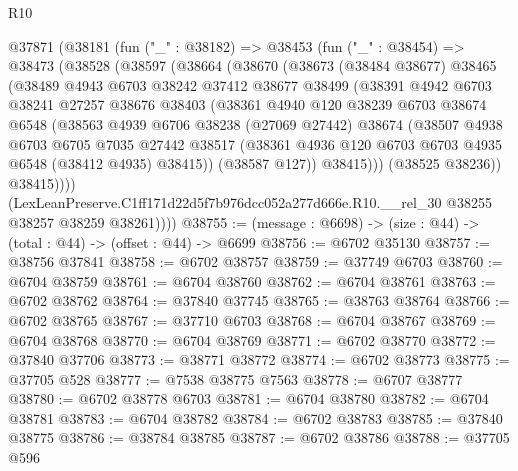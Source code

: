 \begin{lexlean}{R10}
\begin{coremodule}
  @37871
    (@38181
      (fun ("_" : @38182) =>
      @38453
        (fun ("_" : @38454) =>
        @38473
          (@38528
            (@38597
              (@38664
                (@38670
                  (@38673
                    (@38484 @38677)
                    @38465
                    (@38489
                      @4943
                      @6703
                      @38242
                      @37412
                      @38677
                      @38499
                      (@38391
                        @4942
                        @6703
                        @38241
                        @27257
                        @38676
                        @38403
                        (@38361
                          @4940
                          @120
                          @38239
                          @6703
                          @38674
                          @6548
                          (@38563
                            @4939
                            @6706
                            @38238
                            (@27069 @27442)
                            @38674
                            (@38507
                              @4938
                              @6703
                              @6705
                              @7035
                              @27442
                              @38517
                              (@38361 @4936 @120 @6703 @6703 @4935 @6548 (@38412 @4935) @38415))
                            (@38587 @127))
                          @38415)))
                    (@38525 @38236))
                  @38415))))
          (LexLeanPreserve.C1ff171d22d5f7b976dcc052a277d666e.R10.__rel_30
            @38255
            @38257
            @38259
            @38261))))
@38755 := (message : @6698) -> (size : @44) -> (total : @44) -> (offset : @44) -> @6699
@38756 := @6702 @35130
@38757 := @38756 @37841
@38758 := @6702 @38757
@38759 := @37749 @6703
@38760 := @6704 @38759
@38761 := @6704 @38760
@38762 := @6704 @38761
@38763 := @6702 @38762
@38764 := @37840 @37745
@38765 := @38763 @38764
@38766 := @6702 @38765
@38767 := @37710 @6703
@38768 := @6704 @38767
@38769 := @6704 @38768
@38770 := @6704 @38769
@38771 := @6702 @38770
@38772 := @37840 @37706
@38773 := @38771 @38772
@38774 := @6702 @38773
@38775 := @37705 @528
@38777 := @7538 @38775 @7563
@38778 := @6707 @38777
@38780 := @6702 @38778 @6703
@38781 := @6704 @38780
@38782 := @6704 @38781
@38783 := @6704 @38782
@38784 := @6702 @38783
@38785 := @37840 @38775
@38786 := @38784 @38785
@38787 := @6702 @38786
@38788 := @37705 @596

\end{coremodule}
\end{lexlean}
